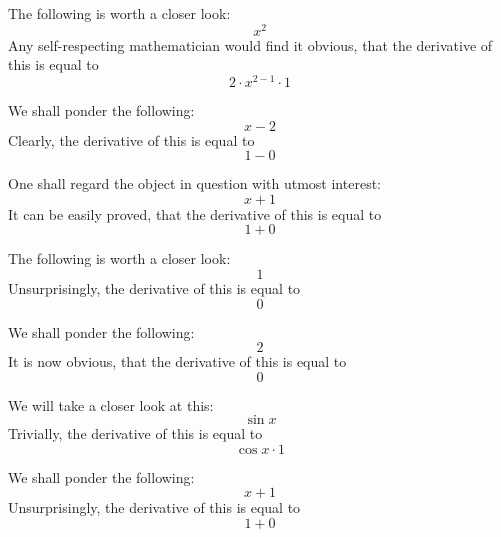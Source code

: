 \documentclass{article}
\begin{document}
The following is worth a closer look:
\begin{equation}
x ^{2 } 
\end{equation}
Any self-respecting mathematician would find it obvious, that the derivative of this is equal to
\begin{equation}
2 \cdot x ^{2 - 1 } \cdot 1 
\end{equation}

We shall ponder the following:
\begin{equation}
x - 2 
\end{equation}
Clearly, the derivative of this is equal to
\begin{equation}
1 - 0 
\end{equation}

One shall regard the object in question with utmost interest:
\begin{equation}
x + 1 
\end{equation}
It can be easily proved, that the derivative of this is equal to
\begin{equation}
1 + 0 
\end{equation}

The following is worth a closer look:
\begin{equation}
1 
\end{equation}
Unsurprisingly, the derivative of this is equal to
\begin{equation}
0 
\end{equation}

We shall ponder the following:
\begin{equation}
2 
\end{equation}
It is now obvious, that the derivative of this is equal to
\begin{equation}
0 
\end{equation}

We will take a closer look at this:
\begin{equation}
\sin x 
\end{equation}
Trivially, the derivative of this is equal to
\begin{equation}
\cos x \cdot 1 
\end{equation}

We shall ponder the following:
\begin{equation}
x + 1 
\end{equation}
Unsurprisingly, the derivative of this is equal to
\begin{equation}
1 + 0 
\end{equation}
\end{document}
